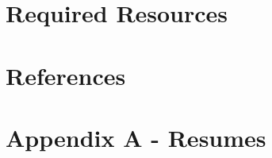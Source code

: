 \documentclass[11pt,letterpaper,final]{report}
\begin{document}
\begin{flushleft}
\setcounter{figure}{0}
\setcounter{section}{0}
\setcounter{table}{0}
\chapter{Required Resources}

\setcounter{figure}{0}
\setcounter{section}{0}
\setcounter{table}{0}
\chapter{References}

\setcounter{figure}{0}
\setcounter{section}{0}
\setcounter{table}{0}
\chapter{Appendix A - Resumes}


\renewcommand{\thefigure}{A.\arabic{figure}}
\setcounter{figure}{0}



\end{flushleft}
\end{document}
